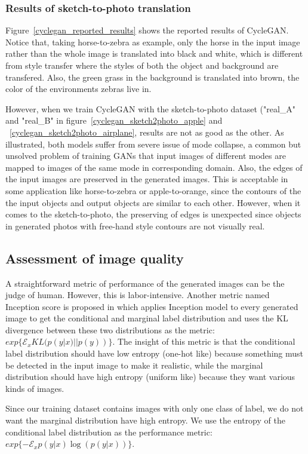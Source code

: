 \subsubsection{Results of sketch-to-photo translation}
Figure~\ref{cyclegan_reported_results} shows the reported results of CycleGAN. Notice that, taking horse-to-zebra as example, only the horse in the input image rather than the whole image is translated into black and white, which is different from style transfer where the styles of both the object and background are transfered. Also, the green grass in the background is translated into brown, the color of the environments zebras live in.

However, when we train CycleGAN with the sketch-to-photo dataset ("real\_A" and "real\_B" in figure~\ref{cyclegan_sketch2photo_apple} and ~\ref{cyclegan_sketch2photo_airplane}, results are not as good as the other. As illustrated, both models suffer from severe issue of mode collapse, a common but unsolved problem of training GANs that input images of different modes are mapped to images of the same mode in corresponding domain. Also, the edges of the input images are preserved in the generated images. This is acceptable in some application like horse-to-zebra or apple-to-orange, since the contours of the the input objects and output objects are similar to each other. However, when it comes to the sketch-to-photo, the preserving of edges is unexpected since objects in generated photos with free-hand style contours are not visually real.

\subsection{Assessment of image quality}
A straightforward metric of performance of the generated images can be the judge of human. However, this is labor-intensive. Another metric named Inception score is proposed in \cite{ImprovedTechnique} which applies Inception model to every generated image to get the conditional and marginal label distribution and uses the KL divergence between these two distributions as the metric: $exp\{\mathcal{E}_x{KL(p(y|x)||p(y))}\}$. The insight of this metric is that the conditional label distribution should have low entropy (one-hot like) because something must be detected in the input image to make it realistic, while the marginal distribution should have high entropy (uniform like) because they want various kinds of images.

Since our training dataset contains images with only one class of label, we do not want the marginal distribution have high entropy. We use the entropy of the conditional label distribution 
as the performance metric: $exp\{-\mathcal{E}_x{p(y|x)\log(p(y|x))}\}$.

